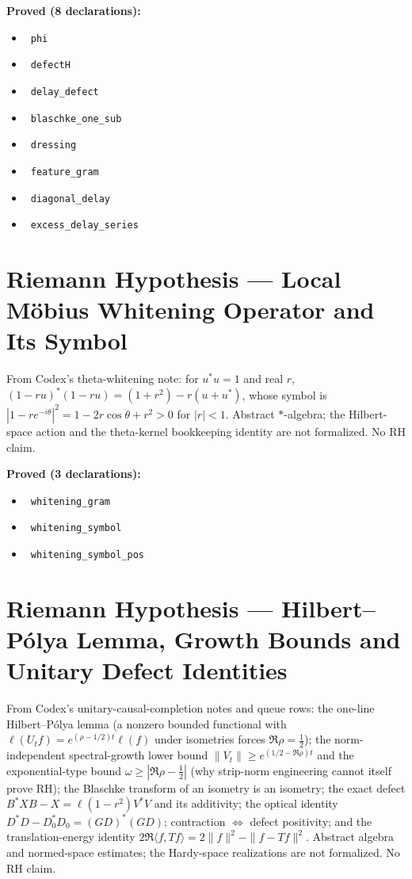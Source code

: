 \documentclass{report}
\theoremstyle{definition}
\begin{document}
\noindent\textbf{Proved (8 declarations):}
\begin{itemize}
  \item {}\leanok\ \texttt{phi}
  \item {}\leanok\ \texttt{defectH}
  \item {}\leanok\ \texttt{delay\_defect}
  \item {}\leanok\ \texttt{blaschke\_one\_sub}
  \item {}\leanok\ \texttt{dressing}
  \item {}\leanok\ \texttt{feature\_gram}
  \item {}\leanok\ \texttt{diagonal\_delay}
  \item {}\leanok\ \texttt{excess\_delay\_series}
\end{itemize}

\section{Riemann Hypothesis --- Local M\"obius Whitening Operator and Its Symbol}
From Codex's theta-whitening note: for $u^*u=1$ and real $r$, $(1-ru)^*(1-ru)=(1+r^2)-r(u+u^*)$, whose symbol is $|1-re^{-i\theta}|^2=1-2r\cos\theta+r^2>0$ for $|r|<1$. Abstract $*$-algebra; the Hilbert-space action and the theta-kernel bookkeeping identity are not formalized. No RH claim.

\noindent\textbf{Proved (3 declarations):}
\begin{itemize}
  \item {}\leanok\ \texttt{whitening\_gram}
  \item {}\leanok\ \texttt{whitening\_symbol}
  \item {}\leanok\ \texttt{whitening\_symbol\_pos}
\end{itemize}

\section{Riemann Hypothesis --- Hilbert--P\'olya Lemma, Growth Bounds and Unitary Defect Identities}
From Codex's unitary-causal-completion notes and queue rows: the one-line Hilbert--P\'olya lemma (a nonzero bounded functional with $\ell(U_tf)=e^{(\rho-1/2)t}\ell(f)$ under isometries forces $\Re\rho=\tfrac12$); the norm-independent spectral-growth lower bound $\|V_t\|\ge e^{(1/2-\Re\rho)t}$ and the exponential-type bound $\omega\ge|\Re\rho-\tfrac12|$ (why strip-norm engineering cannot itself prove RH); the Blaschke transform of an isometry is an isometry; the exact defect $B^*XB-X=\ell(1-r^2)V^*V$ and its additivity; the optical identity $D^*D-D_0^*D_0=(GD)^*(GD)$; contraction $\iff$ defect positivity; and the translation-energy identity $2\Re\langle f,Tf\rangle=2\|f\|^2-\|f-Tf\|^2$. Abstract algebra and normed-space estimates; the Hardy-space realizations are not formalized. No RH claim.
\end{document}
